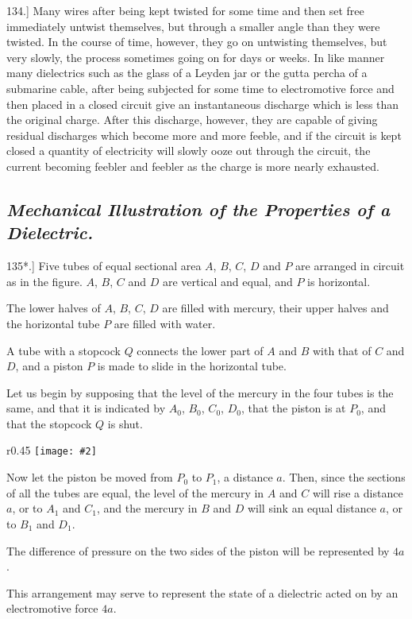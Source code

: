 \documentclass[12pt,oneside]{book}[2021/10/04]
\newcommand{\Heading}{\centering\normalfont}
\newcommand{\Subsection}[1]{\subsection*{\normalsize\Heading\itshape #1}}
\newcommand{\Runhead}[1]{\fancyhead[C]{\iffloatpage{}{\small#1}}}
\newcommand{\article}[1]{\phantomsection \label{art:#1}{#1.]}}
\newcommand{\wrapfig}[3]{
\begin{wrapfigure}{r}{#1\textwidth}
\centering
\texttt{[image: \#2]}
\caption*{\small #3}
\end{wrapfigure}}
\newcommand{\¬}{\hphantom{0}}
\begin{document}
\article{134} Many wires after being kept twisted for some time and
then set free immediately untwist themselves, but through a smaller
angle than they were twisted. In the course of time, however, they
go on untwisting themselves, but very slowly, the process sometimes
going on for days or weeks. In like manner many dielectrics
such as the glass of a Leyden jar or the gutta percha of a submarine
cable, after being subjected for some time to electromotive force
and then placed in a closed circuit give an instantaneous discharge
which is less than the original charge. After this discharge, however,
they are capable of giving residual discharges which become
more and more feeble, and if the circuit is kept closed a quantity of
electricity will slowly ooze out through the circuit, the current
becoming feebler and feebler as the charge is more nearly
exhausted.

\Subsection{Mechanical Illustration of the Properties of a Dielectric.}
\Runhead{MECHANICAL ANALOGIES.}

\article{135*} Five tubes of equal sectional area \(A\), \(B\), \(C\), \(D\) and \(P\) are
arranged in circuit as in the figure. \(A\), \(B\), \(C\) and \(D\) are vertical
and equal, and \(P\) is horizontal.

The lower halves of \(A\), \(B\), \(C\), \(D\)
are filled with mercury, their upper
halves and the horizontal tube \(P\) are
filled with water.

A tube with a stopcock \(Q\) connects
the lower part of \(A\) and \(B\)
with that of \(C\) and \(D\), and a piston
\(P\) is made to slide in the horizontal
tube.

Let us begin by supposing that
the level of the mercury in the four
tubes is the same, and that it is indicated
by \(A_0\), \(B_0\), \(C_0\), \(D_0\), that the
piston is at \(P_0\), and that the stopcock
\(Q\) is shut.

\wrapfig{0.45}{129.png}{Fig. 29.}
Now let the piston be moved from
\(P_0\) to \(P_1\), a distance \(a\). Then, since
the sections of all the tubes are equal, the level of the mercury
in \(A\) and \(C\) will rise a distance \(a\), or to \(A_1\) and \(C_1\), and the mercury
in \(B\) and \(D\) will sink an equal distance \(a\), or to \(B_1\) and \(D_1\).

The difference of pressure on the two sides of the piston will
be represented by \(4a\).

This arrangement may serve to represent the state of a dielectric
acted on by an electromotive force \(4a\).
\end{document}

